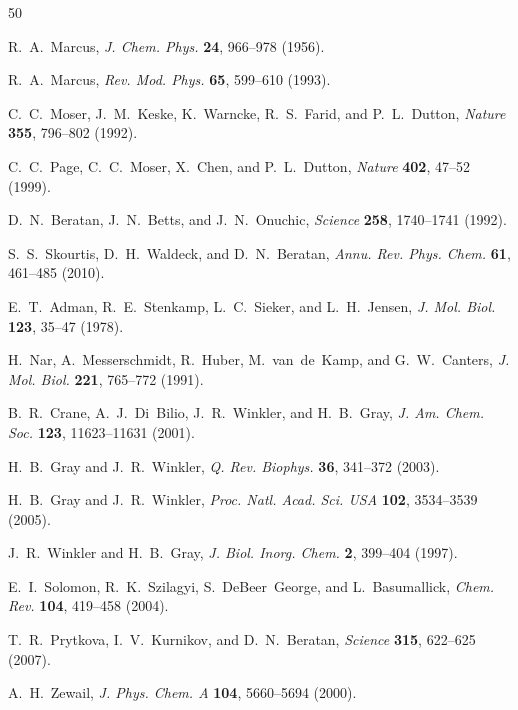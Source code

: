 \documentclass[twocolumn,10pt]{article}
\begin{document}
\begin{thebibliography}{50}

R.~A.~Marcus,
\textit{J. Chem. Phys.} \textbf{24}, 966--978 (1956).

R.~A.~Marcus,
\textit{Rev. Mod. Phys.} \textbf{65}, 599--610 (1993).

C.~C.~Moser, J.~M.~Keske, K.~Warncke, R.~S.~Farid, and P.~L.~Dutton,
\textit{Nature} \textbf{355}, 796--802 (1992).

C.~C.~Page, C.~C.~Moser, X.~Chen, and P.~L.~Dutton,
\textit{Nature} \textbf{402}, 47--52 (1999).

D.~N.~Beratan, J.~N.~Betts, and J.~N.~Onuchic,
\textit{Science} \textbf{258}, 1740--1741 (1992).

S.~S.~Skourtis, D.~H.~Waldeck, and D.~N.~Beratan,
\textit{Annu. Rev. Phys. Chem.} \textbf{61}, 461--485 (2010).


E.~T.~Adman, R.~E.~Stenkamp, L.~C.~Sieker, and L.~H.~Jensen,
\textit{J. Mol. Biol.} \textbf{123}, 35--47 (1978).

H.~Nar, A.~Messerschmidt, R.~Huber, M.~van~de~Kamp, and G.~W.~Canters,
\textit{J. Mol. Biol.} \textbf{221}, 765--772 (1991).

B.~R.~Crane, A.~J.~Di~Bilio, J.~R.~Winkler, and H.~B.~Gray,
\textit{J. Am. Chem. Soc.} \textbf{123}, 11623--11631 (2001).

H.~B.~Gray and J.~R.~Winkler,
\textit{Q. Rev. Biophys.} \textbf{36}, 341--372 (2003).

H.~B.~Gray and J.~R.~Winkler,
\textit{Proc. Natl. Acad. Sci. USA} \textbf{102}, 3534--3539 (2005).

J.~R.~Winkler and H.~B.~Gray,
\textit{J. Biol. Inorg. Chem.} \textbf{2}, 399--404 (1997).

E.~I.~Solomon, R.~K.~Szilagyi, S.~DeBeer~George, and L.~Basumallick,
\textit{Chem. Rev.} \textbf{104}, 419--458 (2004).

T.~R.~Prytkova, I.~V.~Kurnikov, and D.~N.~Beratan,
\textit{Science} \textbf{315}, 622--625 (2007).


A.~H.~Zewail,
\textit{J. Phys. Chem. A} \textbf{104}, 5660--5694 (2000).


\end{thebibliography}
\end{document}
